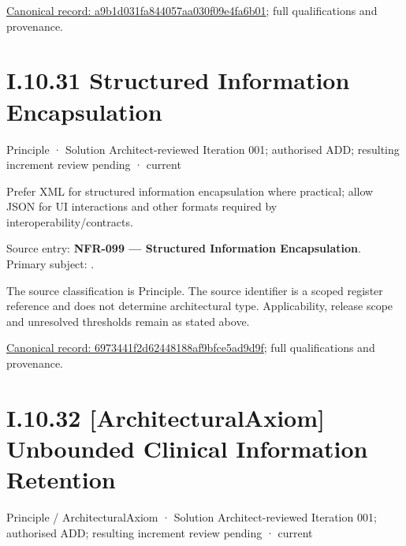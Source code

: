 {\footnotesize \href{../../../../../../../../continuum/motivation/principle/architectural-axiom/a9b1d031fa844057aa030f09e4fa6b01.md}{Canonical record: a9b1d031fa844057aa030f09e4fa6b01}; full qualifications and provenance.}\par
\section*{I.10.31 Structured Information Encapsulation}
\label{navigation:I.10.31}

\label{element:6973441f2d62448188af9bfce5ad9d9f}
{\small Principle · Solution Architect-reviewed Iteration 001; authorised ADD; resulting increment review pending · current}\par

Prefer XML for structured information encapsulation where practical; allow JSON for UI interactions and other formats required by interoperability/contracts.



Source entry: \textbf{NFR-099 — Structured Information Encapsulation}. Primary subject: \texttt{}.



The source classification is Principle. The source identifier is a scoped register reference and does not determine architectural type. Applicability, release scope and unresolved thresholds remain as stated above.


{\footnotesize \href{../../../../../../../../continuum/motivation/principle/6973441f2d62448188af9bfce5ad9d9f.md}{Canonical record: 6973441f2d62448188af9bfce5ad9d9f}; full qualifications and provenance.}\par
\section*{I.10.32 [ArchitecturalAxiom] Unbounded Clinical Information Retention}
\label{navigation:I.10.32}

\label{element:4c270732fecf4e79bb83c938861ce05b}
{\small Principle / ArchitecturalAxiom · Solution Architect-reviewed Iteration 001; authorised ADD; resulting increment review pending · current}\par

